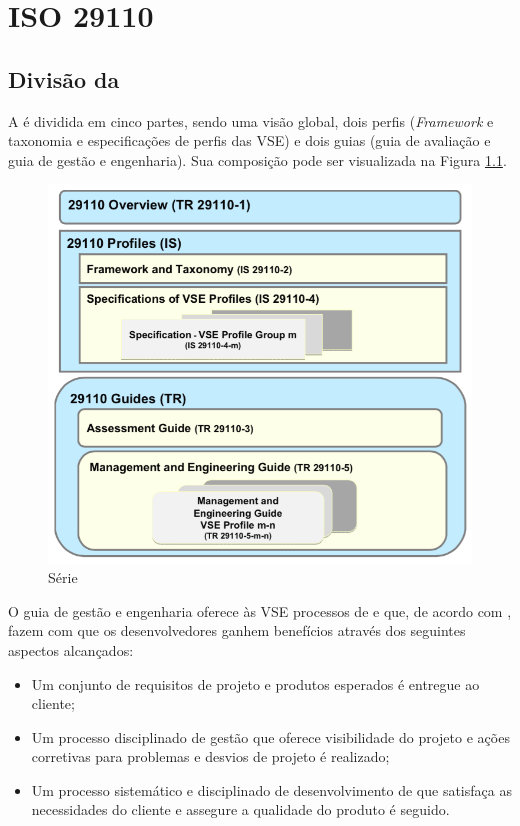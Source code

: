 
\chapter{ISO 29110}

\section{Divisão da \iso}

A \iso é dividida em cinco partes, sendo uma visão global, dois perfis (\textit{Framework} e taxonomia e especificações de perfis das VSE) e dois guias (guia de avaliação e guia de gestão e engenharia). Sua composição pode ser visualizada na Figura \ref{fig:serie:iso}.

\begin{figure}[!h]
\centering
\includegraphics[scale=0.4]{figuras/serie_iso.png}
\caption{Série \iso \cite[pág. 7]{iso}}
\label{fig:serie:iso}
\end{figure}

O guia de gestão e engenharia oferece às VSE processos de \gp e \dsw que, de acordo com \cite{iso}, fazem com que os desenvolvedores ganhem benefícios através dos seguintes aspectos alcançados:

\begin{itemize}

\item Um conjunto de requisitos de projeto e produtos esperados é entregue ao cliente;

\item Um processo disciplinado de gestão que oferece visibilidade do projeto e ações corretivas para problemas e desvios de projeto é realizado;

\item Um processo sistemático e disciplinado de desenvolvimento de \sw que satisfaça as necessidades do cliente e assegure a qualidade do produto é seguido.

\end{itemize}

